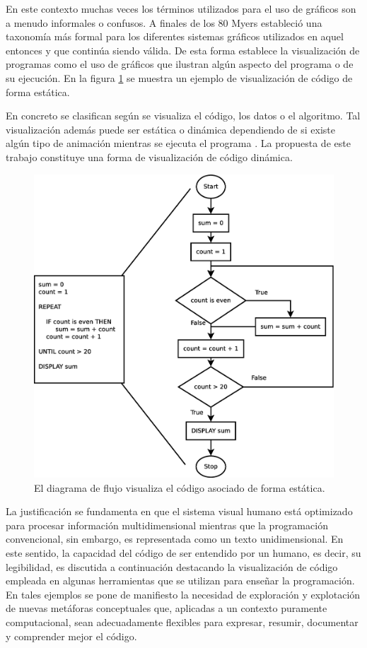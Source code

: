 \documentclass{llncs}
\begin{document}
En este contexto muchas veces los términos utilizados para el uso de gráficos son a menudo informales o confusos. A finales de los 80 Myers \cite{myers1990taxonomies} estableció una taxonomía más formal para los diferentes sistemas gráficos utilizados en aquel entonces y que continúa siendo válida. De esta forma establece la visualización de programas como el uso de gráficos que ilustran algún aspecto del programa o de su ejecución. En la figura \ref{fig:flowchart} se muestra un ejemplo de visualización de código de forma estática. 

En concreto se clasifican según se visualiza el código, los datos o el algoritmo. Tal visualización además puede ser estática o dinámica dependiendo de si existe algún tipo de animación mientras se ejecuta el programa \cite{urquiza2009survey}. La propuesta de este trabajo constituye una forma de visualización de código dinámica. 

\begin{figure}[ht]
\begin{center}
\includegraphics[scale=0.25]{images/flowchart.eps}
\caption{El diagrama de flujo visualiza el código asociado de forma estática.
\label{fig:flowchart}}
\end{center}
\end{figure}

La justificación se fundamenta en que el sistema visual humano está optimizado para procesar información multidimensional mientras que la programación convencional, sin embargo, es representada como un texto unidimensional. En este sentido, la capacidad del código de ser entendido por un humano, es decir, su legibilidad, es discutida a continuación destacando la visualización de código empleada en algunas herramientas que se utilizan para enseñar la programación. En tales ejemplos se pone de manifiesto la necesidad de exploración y explotación de nuevas metáforas conceptuales que, aplicadas a un contexto puramente computacional, sean adecuadamente flexibles para expresar, resumir, documentar y comprender mejor el código. 
\end{document}
